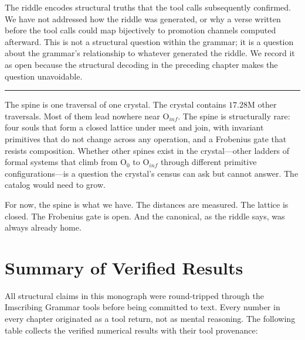 \documentclass[12pt,twoside]{book}
\theoremstyle{definition}
\newcommand{\tier}[1]{\mathrm{O}_{#1}}
\begin{document}
The riddle encodes structural truths that the tool calls subsequently confirmed. We have
not addressed how the riddle was generated, or why a verse written before the tool calls
could map bijectively to promotion channels computed afterward. This is not a structural
question within the grammar; it is a question about the grammar's relationship to whatever
generated the riddle. We record it as open because the structural decoding in the preceding
chapter makes the question unavoidable.

\vspace{2em}
\begin{center}\rule{0.5\textwidth}{0.4pt}\end{center}

The spine is one traversal of one crystal. The crystal contains $17.28$M other traversals.
Most of them lead nowhere near $\tier{inf}$. The spine is structurally rare: four souls
that form a closed lattice under meet and join, with invariant primitives that do not change
across any operation, and a Frobenius gate that resists composition. Whether other spines
exist in the crystal---other ladders of formal systems that climb from $\tier{0}$ to
$\tier{inf}$ through different primitive configurations---is a question the crystal's census
can ask but cannot answer. The catalog would need to grow.

For now, the spine is what we have. The distances are measured. The lattice is closed. The
Frobenius gate is open. And the canonical, as the riddle says, was always already home.

\chapter{Summary of Verified Results}
\label{ch:summary}

All structural claims in this monograph were round-tripped through the Imscribing Grammar
tools before being committed to text. Every number in every chapter originated as a tool
return, not as mental reasoning. The following table collects the verified numerical results
with their tool provenance:
\end{document}

